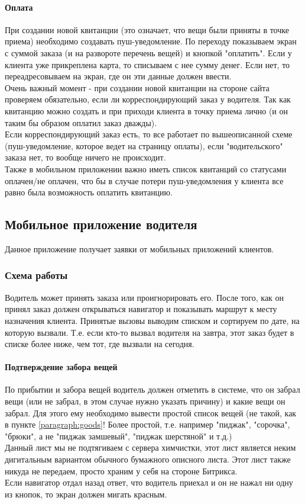 \documentclass[DIV=calc, paper=a4, fontsize=11pt]{scrartcl} %
\begin{document}
\paragraph{Оплата}
При создании новой квитанции (это означает, что вещи были приняты в точке приема) необходимо создавать пуш-уведомление. По переходу показываем экран с суммой заказа (и на развороте перечень вещей) и кнопкой "оплатить". Если у клиента уже прикреплена карта, то списываем с нее сумму денег. Если нет, то переадресовываем на экран, где он эти данные должен ввести.
\\[0.5cm]
Очень важный момент - при создании новой квитанции на стороне сайта проверяем обязательно, если ли корреспондирующий заказ у водителя. Так как квитанцию можно создать и при приходи клиента в точку приема лично (и он таким бы образом оплатил заказ дважды).
\\[0.5cm]
Если корреспондирующий заказ есть, то все работает по вышеописанной схеме (пуш-уведомление, которое ведет на страницу оплаты), если "водительского" заказа нет, то вообще ничего не происходит.
\\[0.5cm]
Также в мобильном приложении важно иметь список квитанций со статусами оплачен/не оплачен, что бы в случае потери пуш-уведомления у клиента все равно была возможность оплатить квитанцию.

\subsection{Мобильное приложение водителя}
Данное приложение получает заявки от мобильных приложений клиентов. 

\subsubsection{Схема работы}
Водитель может принять заказа или проигнорировать его. После того, как он принял заказ должен открываться навигатор и показывать маршрут к месту назначения клиента. Принятые вызовы выводим списком и сортируем по дате, на которую вызвали. Т.е. если кто-то вызвал водителя на завтра, этот заказ будет в списке более ниже, чем тот, где вызвали на сегодня.

\paragraph{Подтверждение забора вещей}
По прибытии и забора вещей водитель должен отметить в системе, что он забрал вещи (или не забрал, в этом случае нужно указать причину) и какие вещи он забрал. Для этого ему необходимо вывести простой список вещей (не такой, как в пункте \ref{paragraph:goods}! Более простой, т.е. например "пиджак", "сорочка", "брюки", а не "пиджак замшевый", "пиджак шерстяной" и т.д.)
\\[0.5cm]
Данный лист мы не подтягиваем с сервера химчистки, этот лист является неким дигитальным вариантом обычного бумажного описного листа. Этот лист также никуда не передаем, просто храним у себя на стороне Битрикса.
\\[0.5cm]
Если навигатор отдал назад ответ, что водитель приехал и он не нажал ни одну из кнопок, то экран должен мигать красным.
\end{document}
